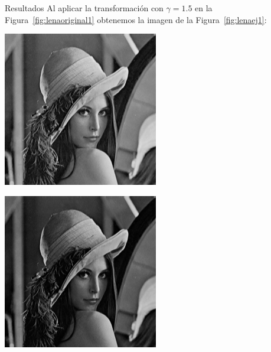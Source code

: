 \documentclass{beamer}
\begin{document}
\begin{frame}[fragile]{Resultados}
	\justifying
	Al aplicar la transformación con $\gamma = 1.5$ en la Figura~\ref{fig:lenaoriginal1} obtenemos la imagen de la Figura~\ref{fig:lenaej1}:
	\vspace{0.5cm}
	
	\centering
	\begin{minipage}{0.45\linewidth}
		\centering
		\includegraphics[width=\linewidth]{../results/lena_original}
		\label{fig:lenaoriginal1}
	\end{minipage}\hfill
	\begin{minipage}{0.45\linewidth}
		\centering
		\includegraphics[width=\linewidth]{../results/lena_ej1}

\end{minipage}
\end{frame}
\end{document}
